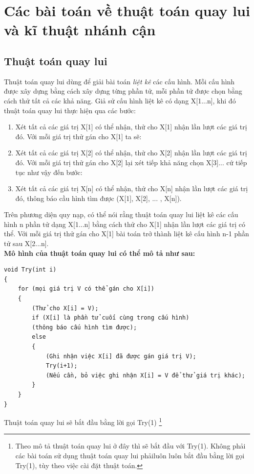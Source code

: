 \documentclass[8pt, a4paper]{article}
\begin{document}
\section{Các bài toán về thuật toán quay lui và kĩ thuật nhánh cận}
\subsection{Thuật toán quay lui}
Thuật toán quay lui dùng để giải bài toán \emph{liệt kê} các cấu hình. Mỗi cấu hình được xây dựng bằng cách xây dựng từng phần tử, mỗi phần tử được chọn bằng cách thử tất cả các khả năng. Giả sử cấu hình liệt kê có dạng X[1...n], khi đó thuật toán quay lui thực hiện qua các bước:
\begin{enumerate}
\item Xét tất cả các giá trị X[1] có thể nhận, thử cho X[1] nhận lần lượt các giá trị đó. Với mỗi giá trị thử gán cho X[1] ta sẽ:
\item Xét tất cả các giá trị X[2] có thể nhận, thử cho X[2] nhận lần lượt các giá trị đó. Với mỗi giá trị thử gán cho X[2] lại xét tiếp khả năng chọn X[3]... cứ tiếp tục như vậy đến bước:
\item Xét tất cả các giá trị X[n] có thể nhận, thử cho X[n] nhận lần lượt các giá trị đó, thông báo cầu hình tìm được (X[1], X[2], ... , X[n]).
\end{enumerate}

Trên phương diện quy nạp, có thể nói rằng thuật toán quay lui liệt kê các cấu hình n phần tử dạng X[1...n] bằng cách thử cho X[1] nhận lần lượt các giá trị có thể. Với mỗi giá trị thử gán cho X[1] bài toán trở thành liệt kê cấu hình n-1 phần tử sau X[2...n].\\

\textbf{Mô hình của thuật toán quay lui có thể mô tả như sau:}

\begin{verbatim}
void Try(int i)
{
    for (mọi giá trị V có thể gán cho X[i])
    {
        (Thử cho X[i] = V);
        if (X[i] là phần tử cuối cùng trong cấu hình)
        (thông báo cấu hình tìm được);
        else
        {
            (Ghi nhận việc X[i] đã được gán giá trị V);
            Try(i+1);
            (Nếu cần, bỏ việc ghi nhận X[i] = V để thử giá trị khác);
        }
    }
}
\end{verbatim}

Thuật toán quay lui sẽ bắt đầu bằng lời gọi Try(1) \footnote{Theo mô tả thuật toán quay lui ở đây thì sẽ bắt đầu với Try(1). Không phải các bài toán sử dụng thuật toán quay lui phảiluôn luôn bắt đầu bằng lời gọi Try(1), tùy theo việc cài đặt thuật toán.}
\end{document}
